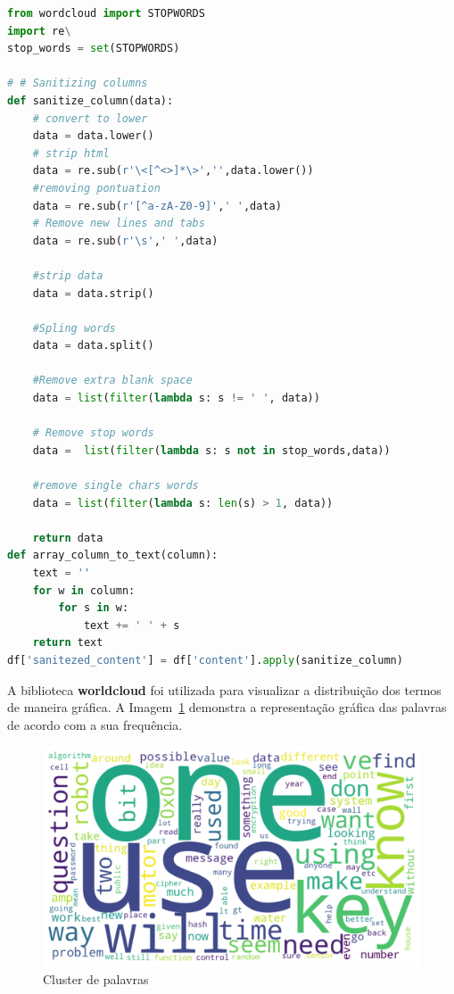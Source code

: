 \begin{lstlisting}[language=Python, caption=Sanitização do texto]
from wordcloud import STOPWORDS
import re\
stop_words = set(STOPWORDS)

# # Sanitizing columns
def sanitize_column(data):
    # convert to lower
    data = data.lower()
    # strip html
    data = re.sub(r'\<[^<>]*\>','',data.lower())
    #removing pontuation
    data = re.sub(r'[^a-zA-Z0-9]',' ',data)
    # Remove new lines and tabs
    data = re.sub(r'\s',' ',data)

    #strip data
    data = data.strip()

    #Spling words
    data = data.split()
    
    #Remove extra blank space
    data = list(filter(lambda s: s != ' ', data))

    # Remove stop words
    data =  list(filter(lambda s: s not in stop_words,data))

    #remove single chars words
    data = list(filter(lambda s: len(s) > 1, data))

    return data
def array_column_to_text(column):
    text = ''
    for w in column:
        for s in w:
            text += ' ' + s 
    return text
df['sanitezed_content'] = df['content'].apply(sanitize_column)
\end{lstlisting}

A biblioteca \textbf{worldcloud} foi utilizada para visualizar a distribuição dos termos de maneira gráfica.
A Imagem~\ref{fig:wordcloud1} demonstra a representação gráfica das palavras de acordo com a sua frequência.

 \begin{figure}[H]
   \centering
   \includegraphics[scale=0.50]{figs/wordcloud1.png}
    \caption{Cluster de palavras}
    \label{fig:wordcloud1}
 \end{figure}

